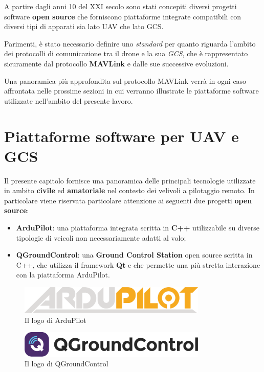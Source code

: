 \documentclass[a4paper, 12pt, oneside]{article}
\begin{document}
A partire dagli anni 10 del XXI secolo sono stati concepiti diversi progetti software \textbf{open source} che forniscono piattaforme integrate compatibili con diversi tipi di apparati sia lato UAV che lato GCS. 

Parimenti, è stato necessario definire uno \textit{standard} per quanto riguarda l'ambito dei protocolli di comunicazione tra il drone e la sua \textit{GCS}, che è rappresentato sicuramente dal protocollo \textbf{MAVLink} e dalle sue successive evoluzioni. 

Una panoramica più approfondita sul protocollo MAVLink verrà in ogni caso affrontata nelle prossime sezioni in cui verranno illustrate le piattaforme software utilizzate nell'ambito del presente lavoro.

\newpage

\section{Piattaforme software per UAV e GCS}
Il presente capitolo fornisce una panoramica delle principali tecnologie utilizzate in ambito \textbf{civile} ed \textbf{amatoriale} nel contesto dei velivoli a pilotaggio remoto. In particolare viene riservata particolare attenzione ai seguenti due progetti \textbf{open source}:

\begin{itemize}
    \item \textbf{ArduPilot}: una piattaforma integrata scritta in \textbf{C++} utilizzabile su diverse tipologie di veicoli non necessariamente adatti al volo;
    \item \textbf{QGroundControl}: una \textbf{Ground Control Station} open source scritta in C++, che utilizza il framework \textbf{Qt} e che permette una più stretta interazione con la piattaforma ArduPilot.
\end{itemize}

\begin{figure}[H]
    \centering
    \includegraphics[width=0.8\textwidth]{images/ardupilot_logo.png}
    \caption{Il logo di ArduPilot}
\end{figure}
\begin{figure}[H]
    \centering
    \includegraphics[width=0.8\textwidth]{images/QGC_RGB_Logo_Horizontal_Positive_PREFERRED.png}
    \caption{Il logo di QGroundControl}
\end{figure}
\end{document}
